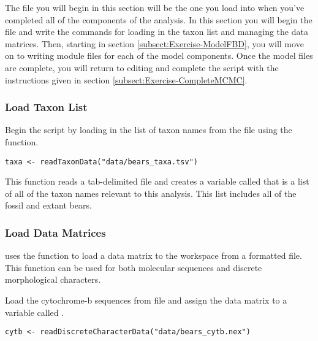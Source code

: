 The file you will begin in this section will be the one you load into \RevBayes when you've completed all of the components of the analysis.
In this section you will begin the file and write the \Rev commands for loading in the taxon list and managing the data matrices.
Then, starting in section \ref{subsect:Exercise-ModelFBD}, you will move on to writing module files for each of the model components. 
Once the model files are complete, you will return to editing  and complete the \Rev script with the instructions given in section \ref{subsect:Exercise-CompleteMCMC}.


\medskip
\subsubsection{Load Taxon List}\label{subsub:Exercise-TaxList}

Begin the \Rev script by loading in the list of taxon names from the  file using the  function.
\begin{snugshade*}
\begin{lstlisting}
taxa <- readTaxonData("data/bears_taxa.tsv")
\end{lstlisting}
\end{snugshade*}
This function reads a tab-delimited file and creates a variable called  that is a list of all of the taxon names relevant to this analysis. 
This list includes all of the fossil and extant bears.



\medskip
\subsubsection{Load Data Matrices}\label{subsub:Exercise-LoadData}

\RevBayes uses the function  to load a data matrix to the workspace from a formatted file. 
This function can be used for both molecular sequences and discrete morphological characters.

Load the cytochrome-b sequences from file and assign the data matrix to a variable called .
{\tt \begin{snugshade*}
\begin{lstlisting}
cytb <- readDiscreteCharacterData("data/bears_cytb.nex") 
\end{lstlisting}
\end{snugshade*}}

